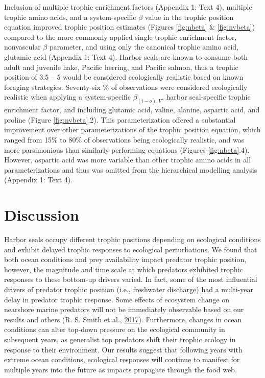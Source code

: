 \documentclass [11pt, proquest] {uwthesis}[2015/03/03]
\begin{document}
Inclusion of multiple trophic enrichment factors (Appendix 1: Text 4),
multiple trophic amino acids, and a system-specific \(\beta\) value in
the trophic position equation improved trophic position estimates
(Figures \ref{fig:nbeta} \& \ref{fig:nvbeta}) compared to the more
commonly applied single trophic enrichment factor, nonvascular \(\beta\)
parameter, and using only the canonical trophic amino acid, glutamic
acid (Appendix 1: Text 4). Harbor seals are known to consume both adult
and juvenile hake, Pacific herring, and Pacific salmon, thus a trophic
position of 3.5 -- 5 would be considered ecologically realistic based on
known foraging strategies. Seventy-six \% of observations were
considered ecologically realistic when applying a system-specific
\(\beta_{(i-o),V}\), harbor seal-specific trophic enrichment factor, and
including glutamic acid, valine, alanine, aspartic acid, and proline
(Figure \ref{fig:nvbeta}.2). This parameterization offered a substantial
improvement over other parameterizations of the trophic position
equation, which ranged from 15\% to 80\% of observations being
ecologically realistic, and was more parsimonious than similarly
performing equations (Figures \ref{fig:nbeta}.4). However, aspartic acid
was more variable than other trophic amino acids in all
parameterizations and thus was omitted from the hierarchical modelling
analysis (Appendix 1: Text 4).

\section{Discussion}\label{discussion-2}

Harbor seals occupy different trophic positions depending on ecological
conditions and exhibit delayed trophic responses to ecological
perturbations. We found that both ocean conditions and prey availability
impact predator trophic position, however, the magnitude and time scale
at which predators exhibited trophic responses to these bottom-up
drivers varied. In fact, some of the most influential drivers of
predator trophic position (i.e., freshwater discharge) had a multi-year
delay in predator trophic response. Some effects of ecosystem change on
nearshore marine predators will not be immediately observable based on
our results and others (R. S. Smith et al.,
\protect\hyperlink{ref-Smith2017}{2017}). Furthermore, changes in ocean
conditions can alter top-down pressure on the ecological community in
subsequent years, as generalist top predators shift their trophic
ecology in response to their environment. Our results suggest that
following years with extreme ocean conditions, ecological responses will
continue to manifest for multiple years into the future as impacts
propagate through the food web.
\end{document}
